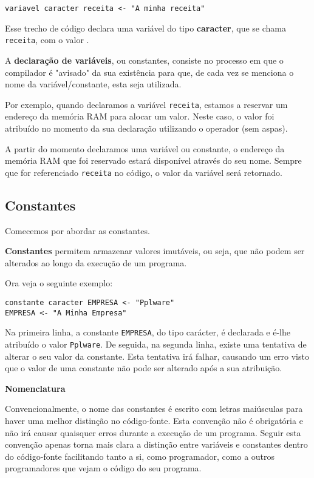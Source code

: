 \begin{lstlisting}
variavel caracter receita <- "A minha receita"    
\end{lstlisting}

Esse trecho de código declara uma variável do tipo \textbf{caracter}, que se chama \texttt{receita}, com o valor .

\begin{defi}
A \textbf{declaração de variáveis}, ou constantes, consiste no processo em que o compilador é "avisado" da sua existência para que, de cada vez se menciona o nome da variável/constante, esta seja utilizada.
\end{defi}

Por exemplo, quando declaramos a variável \texttt{receita}, estamos a reservar um endereço da memória RAM para alocar um valor. Neste caso, o valor foi atribuído no momento da sua declaração utilizando o operador \quotes{$\leftarrow$} (sem aspas).

A partir do momento declaramos uma variável ou constante, o endereço da memória RAM que foi reservado estará disponível através do seu nome. Sempre que for referenciado \texttt{receita} no código, o valor da variável será retornado.

\subsection{Constantes}

Comecemos por abordar as constantes.

\begin{defi}
\textbf{Constantes} permitem armazenar valores imutáveis, ou seja, que não podem ser alterados ao longo da execução de um programa.
\end{defi}

Ora veja o seguinte exemplo:

\begin{lstlisting}
constante caracter EMPRESA <- "Pplware"    
EMPRESA <- "A Minha Empresa"   
\end{lstlisting}

Na primeira linha, a constante \texttt{EMPRESA}, do tipo carácter, é declarada e é-lhe atribuído o valor \texttt{Pplware}. De seguida, na segunda linha, existe uma tentativa de alterar o seu valor da constante. Esta tentativa irá falhar, causando um erro visto que o valor de uma constante não pode ser alterado após a sua atribuição.

\begin{mdframed}[backgroundcolor=cinzaclaro, linewidth=0pt]
\textbf{Nomenclatura} 

Convencionalmente, o nome das constantes é escrito com letras maiúsculas para haver uma melhor distinção no código-fonte. Esta convenção não é obrigatória e não irá causar quaisquer erros durante a execução de um programa. Seguir esta convenção apenas torna mais clara a distinção entre variáveis e constantes dentro do código-fonte facilitando tanto a si, como programador, como a outros programadores que vejam o código do seu programa.
\end{mdframed}

